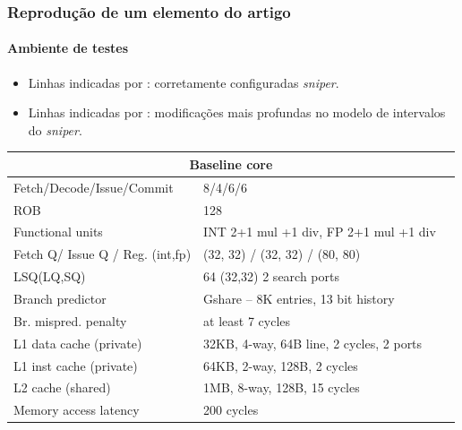 \documentclass[10pt]{beamer}
\newcommand{\cmark}{\ding{51}}%
\newcommand{\xmark}{\ding{55}}%
\begin{document}
\begin{frame}
\frametitle{Reprodução de um elemento do artigo}
\framesubtitle{Ambiente de testes}

\begin{itemize}
  \item Linhas indicadas por \cmark: corretamente configuradas
  \textit{sniper}.
  \item Linhas indicadas por \xmark: modificações mais profundas no modelo de
  intervalos do \textit{sniper}.
\end{itemize}

\begin{table}[h]
    \centering
	\begin{tabular}{| l | l | l | }
		\hline
		\multicolumn{3}{|c|}{ \textbf{Baseline core}} \\ \hline
		Fetch/Decode/Issue/Commit & 8/4/6/6 & \xmark\\ 
		ROB & 128 & \cmark \\ 
		Functional units & INT 2+1 mul +1 div, FP 2+1 mul +1 div & \xmark\\
		Fetch Q/ Issue Q / Reg. (int,fp) & (32, 32) / (32, 32) / (80, 80) & \xmark\\ 
		LSQ(LQ,SQ) & 64 (32,32) 2 search ports & \xmark\\
		Branch predictor & Gshare – 8K entries, 13 bit history & \cmark \\ 
		Br. mispred. penalty & at least 7 cycles & \cmark \\ 
		L1 data cache (private) & 32KB, 4-way, 64B line, 2 cycles, 2 ports &
		\cmark \\
		L1 inst cache (private) & 64KB, 2-way, 128B, 2 cycles & \cmark \\ 
		L2 cache (shared) & 1MB, 8-way, 128B, 15 cycles & \cmark \\ 
		Memory access latency & 200 cycles & \cmark \\ \hline
		
	\end{tabular}
\end{table}

\end{frame}
\end{document}
